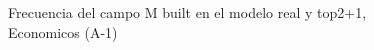 \begin{figure}[H]
    \centering
    
    \caption{Frecuencia del campo M built en el modelo real y top2+1, Economicos (A-1)}
    \label{frecuency-M Built-top2+1}
\end{figure}